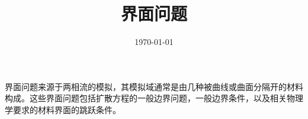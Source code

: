 \documentclass[UTF8,titlepage]{ctexart}
\title{界面问题}
\date{\today}
\begin{document}
\maketitle

界面问题来源于两相流的模拟，其模拟域通常是由几种被曲线或曲面分隔开的材料构成。这些界面问题包括扩散方程的一般边界问题，一般边界条件，以及相关物理学要求的材料界面的跳跃条件\cite{邢亚楠2021椭圆界面问题的广义有限差分方法}。

\vfill \newpage



\end{document}
